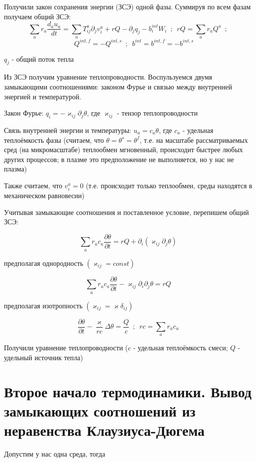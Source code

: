 \documentclass[main.tex]{subfiles}
\begin{document}
Получили закон сохранения энергии (ЗСЭ) одной фазы. Суммируя по всем фазам получаем общий ЗСЭ:
$$\sum\limits_{a}{r_a\frac{d_au_a}{dt}}=\sum\limits_{a}{T_{ij}^a\partial_jv_i^a+rQ-\partial_jq_j-b_i^{int}W_i}\,\,\,;\,\,\,rQ=\sum\limits_{a}{r_aQ^a}\,\,\,;$$$$\,\,\,\,\,\,\,\,\,\,Q^{int,f}=-Q^{int,s}\,\,\,;\,\,\,b^{int}=b^{int,f}=-b^{int,s}$$

$q_j$ - общий поток тепла

Из ЗСЭ получим уравнение теплопроводности. Воспульзуемся двумя замыкающими соотношениями: законом Фурье и связью между внутренней энергией и температурой.

Закон Фурье: $q_i=-\varkappa_{ij}\partial_j\theta$, где $\varkappa_{ij}$ - тензор теплопроводности

Связь внутренней энергии и температуры: $u_a=c_a\theta$, где $c_a$ - удельная теплоёмкость фазы (считаем, что $\theta=\theta^s=\theta^f$, т.е. на масштабе рассматриваемых сред (на микромасштабе) теплообмен мгновенный, происходит быстрее любых других процессов; в плазме это предположение не выполняется, но у нас не плазма)

Также считаем, что $v_i^a=0$ (т.е. происходит только теплообмен, среды находятся в механическом равновесии)

Учитывая замыкающие соотношения и поставленное условие, перепишем общий ЗСЭ:

$$\sum\limits_{a}{r_ac_a\frac{\partial\theta}{\partial t}}=rQ+\partial_i\left(\varkappa_{ij}\partial_j\theta\right)$$

предполагая однородность $\left(\varkappa_{ij}=const\right)$

$$\sum\limits_{a}{r_ac_a\frac{\partial\theta}{\partial t}}-\varkappa_{ij}\partial_i\partial_j\theta=rQ$$

предполагая изотропность $\left(\varkappa_{ij}=\varkappa\delta_{ij}\right)$

$$\frac{\partial\theta}{\partial t}-\frac{\varkappa}{rc}\Delta\theta=\frac{Q}{c}\,\,\,;\,\,\, rc=\sum\limits_{a}{r_ac_a}$$

Получили уравнение теплопроводности ($c$ - удельная теплоёмкость смеси; $Q$ - удельный источник тепла)

\newpage
\section{Второе начало термодинамики. Вывод замыкающих соотношений из неравенства Клаузиуса-Дюгема}

Допустим у нас одна среда, тогда
\end{document}
